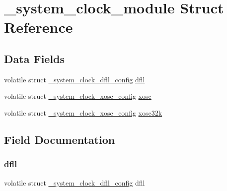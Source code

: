 \hypertarget{struct__system__clock__module}{}\section{\+\_\+system\+\_\+clock\+\_\+module Struct Reference}
\label{struct__system__clock__module}
\subsection*{Data Fields}
\begin{DoxyCompactItemize}
\item 
volatile struct \mbox{\hyperlink{struct__system__clock__dfll__config}{\+\_\+system\+\_\+clock\+\_\+dfll\+\_\+config}} \mbox{\hyperlink{struct__system__clock__module_a08d2ddef57393932cfd148cbbfcf3236}{dfll}}
\item 
volatile struct \mbox{\hyperlink{struct__system__clock__xosc__config}{\+\_\+system\+\_\+clock\+\_\+xosc\+\_\+config}} \mbox{\hyperlink{struct__system__clock__module_af566264dd941ea63e7a7cbbee1a392eb}{xosc}}
\item 
volatile struct \mbox{\hyperlink{struct__system__clock__xosc__config}{\+\_\+system\+\_\+clock\+\_\+xosc\+\_\+config}} \mbox{\hyperlink{struct__system__clock__module_afc9c7a25cb5d055b1c8edf01d0e30a9e}{xosc32k}}
\end{DoxyCompactItemize}


\subsection{Field Documentation}
\mbox{\label{struct__system__clock__module_a08d2ddef57393932cfd148cbbfcf3236}} 
\subsubsection{\texorpdfstring{dfll}{dfll}}
{\footnotesize\ttfamily volatile struct \mbox{\hyperlink{struct__system__clock__dfll__config}{\+\_\+system\+\_\+clock\+\_\+dfll\+\_\+config}} dfll}

\mbox{\label{struct__system__clock__module_af566264dd941ea63e7a7cbbee1a392eb}} 
